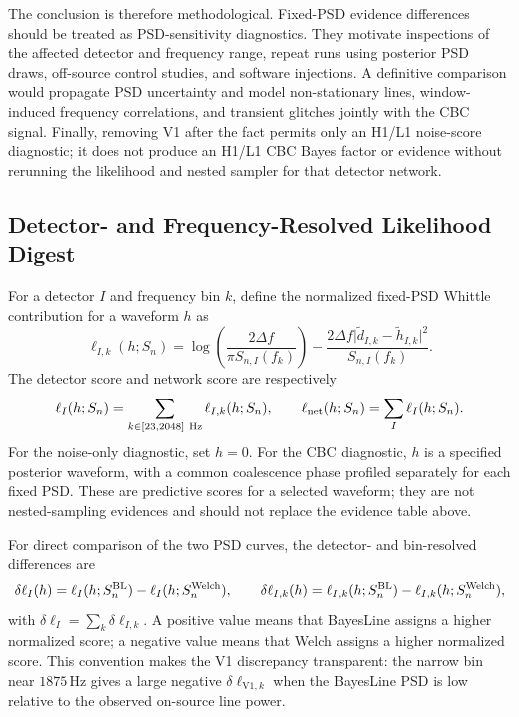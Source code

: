 The conclusion is therefore methodological. Fixed-PSD evidence differences
should be treated as PSD-sensitivity diagnostics. They motivate inspections
of the affected detector and frequency range, repeat runs using posterior PSD
draws, off-source control studies, and software injections. A definitive
comparison would propagate PSD uncertainty and model non-stationary lines,
window-induced frequency correlations, and transient glitches jointly with the
CBC signal. Finally, removing V1 after the fact permits only an H1/L1
noise-score diagnostic; it does not produce an H1/L1 CBC Bayes factor or
evidence without rerunning the likelihood and nested sampler for that detector
network.

\subsection{Detector- and Frequency-Resolved Likelihood Digest}

For a detector $I$ and frequency bin $k$, define the normalized fixed-PSD
Whittle contribution for a waveform $h$ as
\[
\ell_{I,k}(h;S_n) =
\log\!\left(\frac{2\Delta f}{\pi S_{n,I}(f_k)}\right)
- \frac{2\Delta f\lvert\tilde d_{I,k}-\tilde h_{I,k}\rvert^2}
{S_{n,I}(f_k)}.
\]
The detector score and network score are respectively
\[
\ell_I(h;S_n) = \sum_{k\in[23,2048]~\mathrm{Hz}}\ell_{I,k}(h;S_n),
\qquad
\ell_{\rm net}(h;S_n) = \sum_I\ell_I(h;S_n).
\]
For the noise-only diagnostic, set $h=0$. For the CBC diagnostic, $h$ is a
specified posterior waveform, with a common coalescence phase profiled
separately for each fixed PSD. These are predictive scores for a selected
waveform; they are not nested-sampling evidences and should not replace the
evidence table above.

For direct comparison of the two PSD curves, the detector- and bin-resolved
differences are
\[
\delta\ell_I(h) = \ell_I(h;S_n^{\rm BL})-
\ell_I(h;S_n^{\rm Welch}),
\qquad
\delta\ell_{I,k}(h) =
\ell_{I,k}(h;S_n^{\rm BL})-
\ell_{I,k}(h;S_n^{\rm Welch}),
\]
with $\delta\ell_I=\sum_k\delta\ell_{I,k}$. A positive value means that
BayesLine assigns a higher normalized score; a negative value means that
Welch assigns a higher normalized score. This convention makes the V1
discrepancy transparent: the narrow bin near $1875\,\mathrm{Hz}$ gives a
large negative $\delta\ell_{\mathrm{V1},k}$ when the BayesLine PSD is low
relative to the observed on-source line power.

